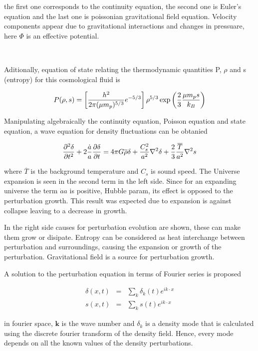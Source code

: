 the first one corresponds to the continuity equation, the second one is Euler's 
equation and the last one is poissonian gravitational field equation. Velocity 
components appear due to gravitational interactions and changes in pressuare,
here $\Phi$ is an effective potential. 

\

Aditionally, equation of state relating the thermodynamic quantities P, 
$\rho$ and s (entropy) for this cosmological fluid is 

\begin{equation}
P(\rho,s)= \left[\frac{h^2}{2\pi(\mu m_p)^{5/3}}e^{-5/3}\right]\rho^{5/3}\exp \left(\frac{2}{3}\frac{\mu m_ps}{k_B}\right)
\label{ec.estado}
\end{equation}

Manipulating algebraically the continuity equation, Poisson equation and state equation,
a wave equation for density fluctuations can be obtanied

\begin{equation}
\frac{\partial^2\delta}{\partial t^2}+2\frac{\dot{a}}{a}\frac{\partial \delta}{\partial t} =
4\pi G \overline{\rho}\delta + \frac{C_s^2}{a^2}\nabla^2\delta+\frac{2}{3}\frac{\overline{T}}{a^2}\nabla^2s
\label{onda}
\end{equation}

where $\overline{T}$ is the background temperature and $C_s$ is sound speed.
The Universe expansion is seen in the second term in the left side. Since for an expanding
universe the term $\dot{a}{a}$ is positive, Hubble param, its effect is opposed to the perturbation 
growth. This result was expected due to expansion is against collapse leaving to
a decrease in growth. 	

In the right side causes for perturbation evolution are shown, these can make them grow 
or disipate. Entropy can be considered as heat interchange between perturbation and 
surroundings, causing the expansion or growth of the perturbation. Gravitational field
is a source for perturbation growth. 

A solution to the perturbation equation in terms of Fourier series is proposed

\begin{eqnarray}
\delta(x,t) &=& \sum_k \delta_k(t)e^{ik\cdot x} \nonumber\\
s(x,t) &=& \sum_k s(t)e^{ik\cdot x} \nonumber
\end{eqnarray}

in fourier space, $\textbf{k}$ is the wave number and $\delta_k$ is 
a density mode that is calculated using the discrete fourier transform
of the density field. Hence, every mode depends on all the known values
of the density perturbations. 

